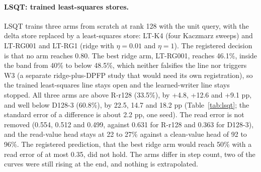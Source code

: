 \sqtwotable

\paragraph{LSQT: trained least-squares stores.}
LSQT trains three arms from scratch at rank 128 with the unit query, with the delta store replaced by a least-squares store: LT-K4 (four Kaczmarz sweeps) and LT-RG001 and LT-RG1 (ridge with $\eta=0.01$ and $\eta=1$).
The registered decision is that no arm reaches 0.80.
The best ridge arm, LT-RG001, reaches 46.1\%, inside the band from 40\% to below 48.5\%, which neither falsifies the line nor triggers W3 (a separate ridge-plus-DPFP study that would need its own registration), so the trained least-squares line stays open and the learned-writer line stays stopped.  %
All three arms are above R-r128 (33.5\%), by +4.8, +12.6 and +9.1 pp, and well below D128-3 (60.8\%), by 22.5, 14.7 and 18.2 pp (Table~\ref{tab:lsqt}; the standard error of a difference is about 2.2 pp, one seed).  %
The read error is not removed (0.554, 0.512 and 0.499, against 0.631 for R-r128 and 0.363 for D128-3), and the read-value head stays at 22 to 27\% against a clean-value head of 92 to 96\%.  %
The registered prediction, that the best ridge arm would reach 50\% with a read error of at most 0.35, did not hold.  %
The arms differ in step count, two of the curves were still rising at the end, and nothing is extrapolated.  %

\lsqttable

